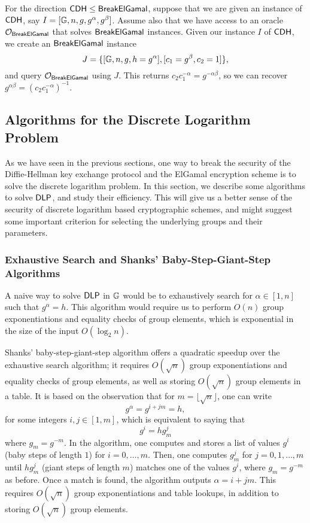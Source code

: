 For the direction ${\sf CDH} \leq {\sf BreakElGamal}$, suppose that we are given an 
instance of ${\sf CDH}$, say $I = [\mathbb{G}, n, g, g^\alpha, g^\beta]$. Assume also that 
we have access to an oracle ${\cal O}_{{\sf BreakElGamal}}$ that solves 
${\sf BreakElGamal}$ instances. Given our instance $I$ of ${\sf CDH}$, we create an 
${\sf BreakElGamal}$ instance 
\[ J = \{[\mathbb{G}, n, g, h = g^\alpha], [c_1 = g^\beta, c_2 = 1]\}, \] 
and query ${\cal O}_{{\sf BreakElGamal}}$ using $J$. This returns $c_2c_1^{-\alpha} 
= g^{-\alpha\beta}$, so we can recover $g^{\alpha\beta} = (c_2c_1^{-\alpha})^{-1}$. 

\subsection{Algorithms for the Discrete Logarithm Problem}
As we have seen in the previous sections, one way to break the security of the 
Diffie-Hellman key exchange protocol and the ElGamal encryption scheme is to solve 
the discrete logarithm problem. In this section, we describe some algorithms to 
solve ${\sf DLP}$, and study their efficiency. This will give us a better sense of the 
security of discrete logarithm based cryptographic schemes, and might suggest some 
important criterion for selecting the underlying groups and their parameters.

\subsubsection{Exhaustive Search and Shanks' Baby-Step-Giant-Step Algorithms}
A naive way to solve ${\sf DLP}$ in $\mathbb{G}$ would be to exhaustively search for $\alpha
\in [1, n]$ such that $g^\alpha = h$. This algorithm would require us to perform 
$O(n)$ group exponentiations and equality checks of group elements, which is 
exponential in the size of the input $O(\log_2 n)$.

Shanks' baby-step-giant-step algorithm offers a quadratic speedup over the 
exhaustive search algorithm; it requires $O(\sqrt{n})$ group exponentiations 
and equality checks of group elements, as well as storing $O(\sqrt{n})$ 
group elements in a table. It is based on the observation that for 
$m = \lfloor{\sqrt n}\rfloor$, one can write 
\[ g^\alpha = g^{i+jm} = h, \] 
for some integers $i, j \in [1, m]$, which is equivalent to saying that 
\[ g^i = hg_m^j \] 
where $g_m = g^{-m}$. In the algorithm, one computes and stores a list of 
values $g^i$ (baby steps of length $1$) for $i = 0, \dots, m$. Then, one 
computes $g_m^j$ for $j = 0, 1, \dots, m$ until $hg_m^j$ (giant steps of 
length $m$) matches one of the values $g^i$, where $g_m = g^{-m}$ as before. 
Once a match is found, the algorithm outputs $\alpha = i + jm$. This 
requires $O(\sqrt n)$ group exponentiations and table lookups, in addition 
to storing $O(\sqrt n)$ group elements. 

